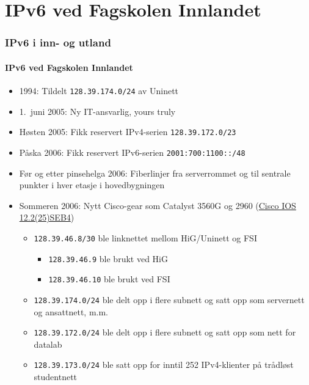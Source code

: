 \section{IPv6 ved Fagskolen Innlandet}
\begin{frame}
  \frametitle{IPv6 i inn- og utland}
  \framesubtitle{IPv6 ved Fagskolen Innlandet}
  \begin{itemize}
  \item 1994: Tildelt \texttt{128.39.174.0/24} av Uninett
  \item 1.~juni 2005: Ny IT-ansvarlig, yours truly
  \item Høsten 2005: Fikk reservert IPv4-serien
    \texttt{128.39.172.0/23}
  \item Påska 2006: Fikk reservert IPv6-serien
    \texttt{2001:700:1100::/48}
  \item Før og etter pinsehelga 2006: Fiberlinjer fra serverrommet og
    til sentrale punkter i hver etasje i hovedbygningen
  \item Sommeren 2006: Nytt Cisco-gear som Catalyst 3560G og 2960
    (\href{http://www.cisco.com/en/US/docs/switches/lan/catalyst3560/software/release/12.2_25_seb/release/notes/OL7189.html}{Cisco
      IOS 12.2(25)SEB4})
    \begin{itemize}
    \item \texttt{128.39.46.8/30} ble linknettet mellom HiG/Uninett og
      FSI
      \begin{itemize}
      \item \texttt{128.39.46.9\phantom{0}} ble brukt ved HiG
      \item \texttt{128.39.46.10} ble brukt ved FSI
      \end{itemize}
    \item \texttt{128.39.174.0/24} ble delt opp i flere subnett og
      satt opp som servernett og ansattnett, m.m.
    \item \texttt{128.39.172.0/24} ble delt opp i flere subnett og
      satt opp som nett for datalab
    \item \texttt{128.39.173.0/24} ble satt opp for inntil 252
      IPv4-klienter på trådløst studentnett
    \end{itemize}
  \end{itemize}
\end{frame}


